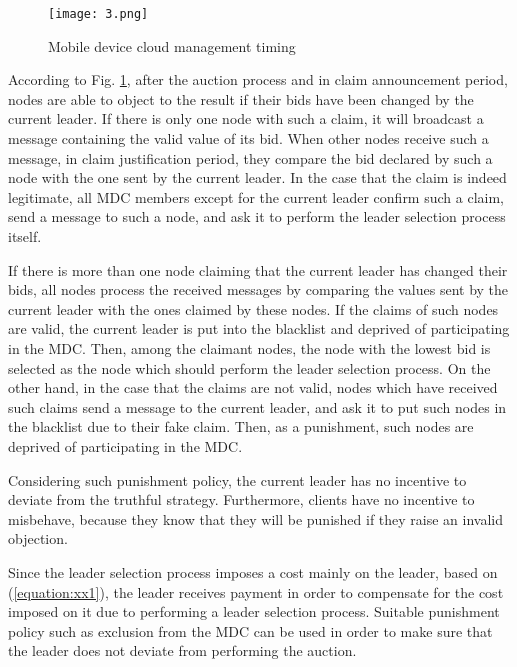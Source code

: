 \documentclass[journal,12pt, onecolumn]{IEEEtran}
\begin{document}
\begin{figure}[h]
\begin{center}
\texttt{[image: 3.png]}
\caption{Mobile device cloud management timing}
\label{figure_5}
\end{center}
\end{figure}

According to Fig. \ref{figure_5}, after the auction process and in claim announcement period, nodes are able to object to the result if their bids have been changed by the current leader. If there is only one node with such a claim, it will broadcast a message containing the valid value of its bid. When other nodes receive such a message, in claim justification period, they compare the bid declared by such a node with the one sent by the current leader. In the case that the claim is indeed legitimate, all MDC members except for the current leader confirm such a claim, send a message to such a node, and ask it to perform the leader selection process itself. 

If there is more than one node claiming that the current leader has changed their bids, all nodes process the received messages by comparing the values sent by the current leader with the ones claimed by these nodes. If the claims of such nodes are valid, the current leader is put into the blacklist and deprived of participating in the MDC. Then, among the claimant nodes, the node with the lowest bid is selected as the node which should perform the leader selection process. On the other hand, in the case that the claims are not valid, nodes which have received such claims send a message to the current leader, and ask it to put such nodes in the blacklist due to their fake claim. Then, as a punishment, such nodes are deprived of participating in the MDC.

Considering such punishment policy, the current leader has no incentive to deviate from the truthful strategy. Furthermore, clients have no incentive to misbehave, because they know that they will be punished if they raise an invalid objection.

Since the leader selection process imposes a cost mainly on the leader, based on (\ref{equation:xx1}), the leader receives payment in order to compensate for the cost imposed on it due to performing a leader selection process. Suitable punishment policy such as exclusion from the MDC can be used in order to make sure that the leader does not deviate from performing the auction.
\end{document}
